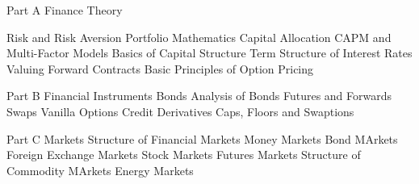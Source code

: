 

Part A Finance Theory

Risk and Risk Aversion
Portfolio Mathematics
Capital Allocation
CAPM and Multi-Factor Models
Basics of Capital Structure
Term Structure of Interest Rates
Valuing Forward Contracts
Basic Principles of Option Pricing

Part B Financial Instruments
Bonds
Analysis of Bonds
Futures and Forwards
Swaps
Vanilla Options
Credit Derivatives
Caps, Floors and Swaptions

Part C Markets
Structure of Financial Markets
Money Markets
Bond MArkets
Foreign Exchange Markets
Stock Markets
Futures Markets
Structure of Commodity MArkets
Energy Markets
